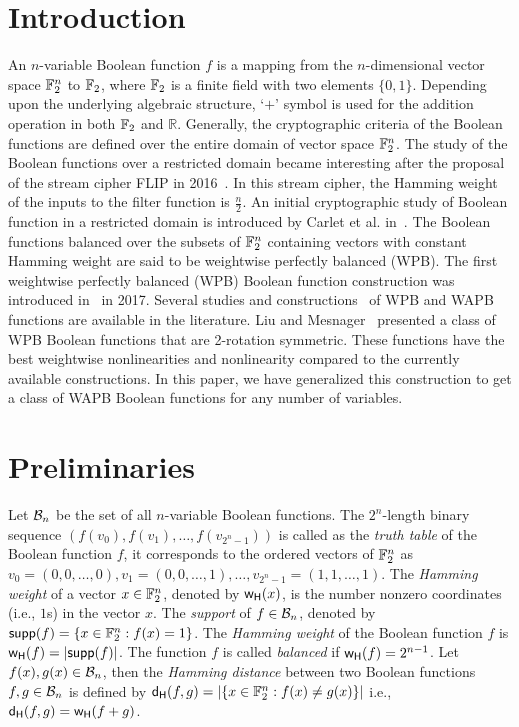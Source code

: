\documentclass{llncs}
\begin{document}
\section{Introduction}
An $n$-variable Boolean function $f$ is a mapping from the $n$-dimensional vector space $\mathbb{F}_2^n$ to $\mathbb{F}_2$, where $\mathbb{F}_2$ is a finite field with two elements $\{0,1\}$. Depending upon the underlying algebraic structure, `$+$' symbol is used for the addition operation in both $\mathbb{F}_2$ and $\mathbb{R}$. 
Generally, the cryptographic criteria of the Boolean functions are defined over the entire domain of vector space $\mathbb{F}_2^n$. The study of the Boolean functions over a restricted domain became interesting after the proposal of the stream cipher FLIP in 2016~\cite{EC:MJSC16}. 
In this stream cipher, the Hamming weight of the inputs to the filter function is  $\frac{n}{2}$.  
An initial cryptographic study of Boolean function in a restricted domain is introduced by Carlet et al. in~\cite{TOSC:CarMeaRot17}.    
The Boolean functions balanced over the subsets of $\mathbb{F}_2^n$ containing vectors with constant Hamming weight are said to be weightwise perfectly balanced (WPB). The first weightwise perfectly balanced (WPB) Boolean function construction was introduced in~\cite{TOSC:CarMeaRot17} in 2017. Several studies and constructions~\cite{CC:TangLiu19,DCC:LiuMes19,DAM:LiSu20,CC:MesSu21,DAM:Su21,DAM:ZhuSu22,DAM:GinMea22,INDO:GinMea22,Latin:GinMea23,DAM:ZLCQZ23,AMC:DM24} of WPB and WAPB functions are available in the literature.
Liu and Mesnager~\cite{DCC:LiuMes19} presented a class of WPB Boolean functions that are 2-rotation symmetric. These functions have the best weightwise nonlinearities and nonlinearity compared to the currently available constructions. In this paper, we have generalized this construction to get a class of WAPB Boolean functions for any number of variables.
\section{Preliminaries}
Let $\mathcal{B}_n$ be the set of all $n$-variable Boolean functions. 
The $2^n$-length binary sequence $(f(v_0), f(v_1), \ldots, f(v_{2^n-1}))$ is called as the {\em truth table} of the Boolean function $f$, it corresponds to the ordered vectors of $\mathbb{F}_2^n$ as $v_0 = (0,0,\ldots,0), v_1= (0,0,\ldots,1),\ldots, v_{2^n-1}=(1,1,\ldots,1)$. 
The {\em Hamming weight} of a vector $x \in \mathbb{F}_2^n$, denoted by $\mathsf{w_H}(x)$, is the number nonzero coordinates (i.e., $1$s) in the vector $x$. The {\em support} of $f \in \mathcal{B}_n$, denoted by $\mathsf{supp}(f)= \{x \in \mathbb{F}_2^n : f(x) = 1\}$. The {\em Hamming weight} of the Boolean function $f$ is $\mathsf{w_H}(f) = |\mathsf{supp}(f)|$. The function $f$ is called {\em balanced} if $\mathsf{w_H}(f)= 2^{n-1}$. Let $f(x), g(x) \in \mathcal{B}_n$, then the {\em Hamming distance} between two Boolean functions $f, g \in \mathcal{B}_n$ is defined by $\mathsf{d_H}(f,g) = |\{x \in \mathbb{F}_2^n : f(x) \neq g(x) \}|$  i.e., $\mathsf{d_H}(f,g) = \mathsf{w_H}(f + g)$.
\end{document}
